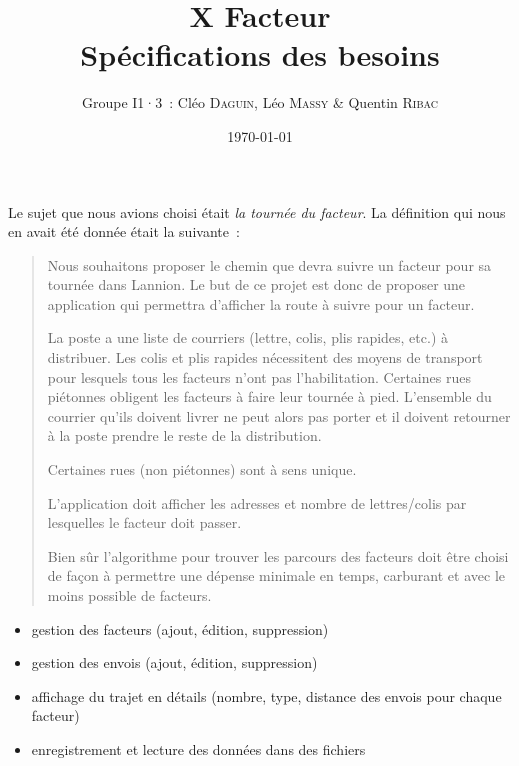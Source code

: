 \documentclass[a4paper, 12pt]{article}
\title{X Facteur\\Spécifications des besoins}
\author{Groupe I1·3 : Cléo \textsc{Daguin}, Léo \textsc{Massy} \& Quentin \textsc{Ribac}}
\date{\today}
\begin{document}
\maketitle

Le sujet que nous avions choisi était \emph{la tournée du facteur}. La définition qui nous en avait été donnée était la suivante :
\\

\begin{quotation}
Nous souhaitons proposer le chemin que devra suivre un facteur pour sa tournée dans Lannion. Le but de ce projet est donc de proposer une application qui permettra d'afficher la route à suivre pour un facteur.

La poste a une liste de courriers (lettre, colis, plis rapides, etc.) à distribuer. Les colis et plis rapides nécessitent des moyens de transport pour lesquels tous les facteurs n'ont pas l'habilitation. Certaines rues piétonnes obligent les facteurs à faire leur tournée à pied. L'ensemble du courrier qu'ils doivent livrer ne peut alors pas porter et il doivent retourner à la poste prendre le reste de la distribution.

Certaines rues (non piétonnes) sont à sens unique.

L'application doit afficher les adresses et nombre de lettres/colis par lesquelles le facteur doit passer. 

Bien sûr l'algorithme pour trouver les parcours des facteurs doit être choisi de façon à permettre une dépense minimale en temps, carburant et avec le moins possible de facteurs.
\end{quotation}

\begin{itemize}
	\item gestion des facteurs (ajout, édition, suppression)
	\item gestion des envois (ajout, édition, suppression)
	\item affichage du trajet en détails (nombre, type, distance des envois pour chaque facteur)
\end{itemize}

\begin{itemize}
	\item enregistrement et lecture des données dans des fichiers
\end{itemize}
\end{document}
